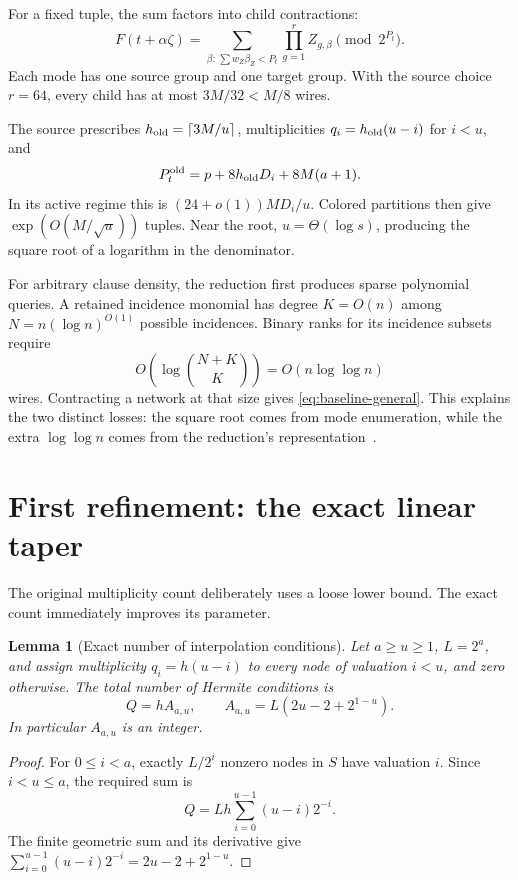 \documentclass[11pt,letterpaper]{article}
\numberwithin{equation}{section}
\newtheorem{lemma}[theorem]{Lemma}
\theoremstyle{definition}
\theoremstyle{remark}
\newcommand{\ceil}[1]{\left\lceil #1\right\rceil}
\begin{document}
For a fixed tuple, the sum factors into child contractions:
\begin{equation}
 F(t+\alpha\zeta)
   =\sum_{\beta:\,\sum w_Z\beta_Z<P_t}
                \prod_{g=1}^{r} Z_{g,\beta}\pmod {2^{P_t}}.
 \label{eq:mode-identity}
\end{equation}
Each mode has one source group and one target group. With the source choice
$r=64$, every child has at most $3M/32<M/8$ wires.

The source prescribes $h_{\rm old}=\ceil{3M/u}$, multiplicities
$q_i=h_{\rm old}(u-i)$ for $i<u$, and
\begin{equation}
 P_t^{\rm old}=p+8h_{\rm old}D_i+8M(a+1).
 \label{eq:old-precision}
\end{equation}
In its active regime this is $(24+o(1))MD_i/u$. Colored partitions then give
$\exp(O(M/\sqrt u))$ tuples. Near the root, $u=\Theta(\log s)$, producing the
square root of a logarithm in the denominator.

For arbitrary clause density, the reduction first produces sparse polynomial
queries. A retained incidence monomial has degree $K=O(n)$ among
$N=n(\log n)^{O(1)}$ possible incidences. Binary ranks for its incidence
subsets require
\begin{equation}
 O\!\left(\log\binom{N+K}{K}\right)=O(n\log\log n)
 \label{eq:dense-entropy}
\end{equation}
wires. Contracting a network at that size gives
\eqref{eq:baseline-general}. This explains the two distinct losses:
the square root comes from mode enumeration, while the extra $\log\log n$
comes from the reduction's representation~\cite{reduction}.

\section{First refinement: the exact linear taper}
\label{sec:linear}

The original multiplicity count deliberately uses a loose lower bound.
The exact count immediately improves its parameter.

\begin{lemma}[Exact number of interpolation conditions]
\label{lem:exact-jets}
Let $a\ge u\ge1$, $L=2^a$, and assign multiplicity
$q_i=h(u-i)$ to every node of valuation $i<u$, and zero otherwise.
The total number of Hermite conditions is
\begin{equation}
 Q=h A_{a,u},\qquad
 A_{a,u}=L\left(2u-2+2^{1-u}\right).
 \label{eq:jets}
\end{equation}
In particular $A_{a,u}$ is an integer.
\end{lemma}
\begin{proof}
For $0\le i<a$, exactly $L/2^i$ nonzero nodes in $S$ have valuation $i$.
Since $i<u\le a$, the required sum is
\[
 Q=Lh\sum_{i=0}^{u-1}(u-i)2^{-i}.
\]
The finite geometric sum and its derivative give
$\sum_{i=0}^{u-1}(u-i)2^{-i}=2u-2+2^{1-u}$.
\end{proof}
\end{document}

